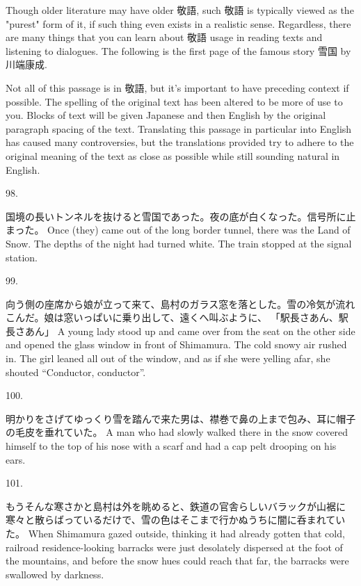 \par{  Though older literature may have older 敬語, such 敬語 is typically viewed as the "purest" form of it, if such thing even exists in a realistic sense. Regardless, there are many things that you can learn about 敬語 usage in reading texts and listening to dialogues. The following is the first page of the famous story 雪国 by 川端康成. }

\par{ Not all of this passage is in 敬語, but it's important to have preceding context if possible. The spelling of the original text has been altered to be more of use to you. Blocks of text will be given Japanese and then English by the original paragraph spacing of the text. Translating this passage in particular into English has caused many controversies, but the translations provided try to adhere to the original meaning of the text as close as possible while still sounding natural in English. }

\par{98. }

\par{国境の長いトンネルを抜けると雪国であった。夜の底が白くなった。信号所に止まった。 \hfill\break
Once (they) came out of the long border tunnel, there was the Land of Snow. The depths of the night had turned white. The train stopped at the signal station. }

\par{99. }

\par{向う側の座席から娘が立って来て、島村のガラス窓を落とした。雪の冷気が流れこんだ。娘は窓いっぱいに乗り出して、遠くへ叫ぶように、 \hfill\break
「駅長さあん、駅長さあん」 \hfill\break
A young lady stood up and came over from the seat on the other side and opened the glass window in front of Shimamura. The cold snowy air rushed in. The girl leaned all out of the window, and as if she were yelling afar, she shouted “Conductor, conductor”. }

\par{100. }

\par{明かりをさげてゆっくり雪を踏んで来た男は、襟巻で鼻の上まで包み、耳に帽子の毛皮を垂れていた。 \hfill\break
A man who had slowly walked there in the snow covered himself to the top of his nose with a scarf and had a cap pelt drooping on his ears. }

\par{101. }
 
\par{もうそんな寒さかと島村は外を眺めると、鉄道の官舎らしいバラックが山裾に寒々と散らばっているだけで、雪の色はそこまで行かぬうちに闇に呑まれていた。 \hfill\break
When Shimamura gazed outside, thinking it had already gotten that cold, railroad residence-looking barracks were just desolately dispersed at the foot of the mountains, and before the snow hues could reach that far, the barracks were swallowed by darkness. }

